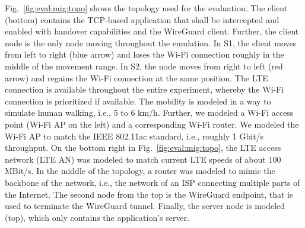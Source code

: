 Fig.~\ref{fig:eval:mig:topo} shows the topology used for the evaluation.
The client (bottom) contains the TCP-based application that shall be intercepted and enabled with handover capabilities and the WireGuard client.
Further, the client node is the only node moving throughout the emulation.
In S1, the client moves from left to right (blue arrow) and loses the Wi-Fi connection roughly in the middle of the movement range. 
In S2, the node moves from right to left (red arrow) and regains the Wi-Fi connection at the same position.
The LTE connection is available throughout the entire experiment, whereby the Wi-Fi connection is prioritized if available.
The mobility is modeled in a way to simulate human walking, i.e., 5 to 6 km/h.
Further, we modeled a Wi-Fi access point (Wi-Fi AP on the left) and a corresponding Wi-Fi router.
We modeled the Wi-Fi AP to match the IEEE 802.11ac standard, i.e., roughly 1 Gbit/s throughput.
On the bottom right in Fig.~\ref{fig:eval:mig:topo}, the LTE access network (LTE AN) was modeled to match current LTE speeds of about 100 MBit/s.
In the middle of the topology, a router was modeled to mimic the backbone of the network, i.e., the network of an ISP connecting multiple parts of the Internet.
The second node from the top is the WireGuard endpoint, that is used to terminate the WireGuard tunnel.
Finally, the server node is modeled (top), which only contains the application's server.


